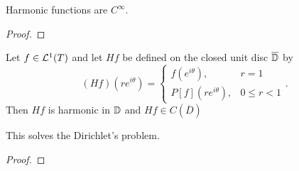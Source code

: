\documentclass[11pt,a4paper]{article}
\begin{document}
\begin{corollary}
  Harmonic functions are $C^{\infty}$.
\end{corollary}
\begin{proof}
\end{proof}

\begin{theorem}
  Let $f \in \mathcal{L}^1(T)$ and let $Hf$ be defined on the closed unit disc
  $\overline {\mathbb{D}}$ by
  \[
    (Hf)(r e^{i \theta}) =
    \begin{cases}
      f(e^{i \theta}), &r = 1 \\
      P[f](r e^{i \theta}), &0 \le r < 1
    \end{cases}.
  \]
  Then $Hf$ is harmonic in $\mathbb{D}$ and $Hf \in C(\overline D)$
\end{theorem}
\begin{remark}
  This solves the Dirichlet's problem.
\end{remark}
\begin{proof}

\end{proof}
\end{document}
